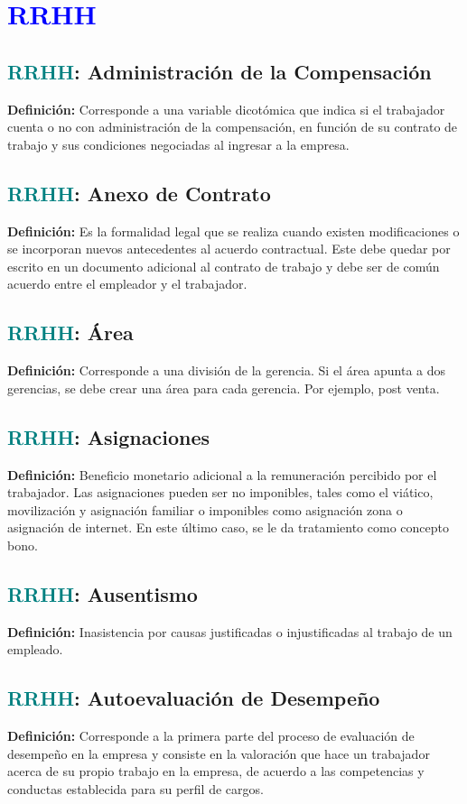 \documentclass[12pt]{article}
\begin{document}
\section{\textcolor{blue}{RRHH}}
\subsection{\textcolor{teal}{RRHH}: Administración de la Compensación}
\textbf{Definición:} Corresponde a una variable dicotómica que indica si el trabajador cuenta o no con administración de la compensación, en función de su contrato de trabajo y sus condiciones negociadas al ingresar a la empresa.
\subsection{\textcolor{teal}{RRHH}: Anexo de Contrato}
\textbf{Definición:} Es la formalidad legal que se realiza cuando existen modificaciones o se incorporan nuevos antecedentes al acuerdo contractual. Este debe quedar por escrito en un documento adicional al contrato de trabajo y debe ser de común acuerdo entre el empleador y el trabajador.
\subsection{\textcolor{teal}{RRHH}: Área}
\textbf{Definición:} Corresponde a una división de la gerencia. Si el área apunta a dos gerencias, se debe crear una área para cada gerencia. Por ejemplo, post venta.
\subsection{\textcolor{teal}{RRHH}: Asignaciones}
\textbf{Definición:} Beneficio monetario adicional a la remuneración percibido por el trabajador. Las asignaciones pueden ser no imponibles, tales como el viático, movilización y asignación familiar o imponibles como asignación zona o asignación de internet. En este último caso, se le da tratamiento como concepto bono.
\subsection{\textcolor{teal}{RRHH}: Ausentismo}
\textbf{Definición:} Inasistencia por causas justificadas o injustificadas al trabajo de un empleado.
\subsection{\textcolor{teal}{RRHH}: Autoevaluación de Desempeño}
\textbf{Definición:} Corresponde a la primera parte del proceso de evaluación de desempeño en la empresa y consiste en la valoración que hace un trabajador acerca de su propio trabajo en la empresa, de acuerdo a las competencias y conductas establecida para su perfil de cargos.
\end{document}
